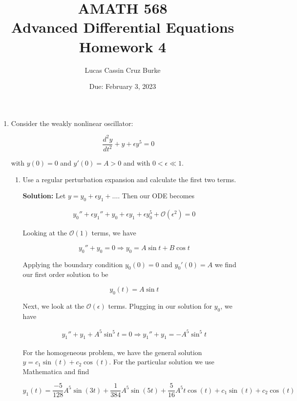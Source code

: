 \documentclass[12pt, a4paper]{article}
\begin{document}
\title{{AMATH 568\\
Advanced Differential Equations}\\
{\bf \Huge Homework 4}}

\author{Lucas Cassin Cruz Burke}

\date{Due: February 3, 2023}

\maketitle

\begin{enumerate}

\item Consider the weakly nonlinear oscillator: 

$$\frac{d^2 y}{dt^2} + y + \epsilon y^5 = 0$$

with $y(0)=0$ and $y'(0)=A>0$ and with $0 < \epsilon \ll 1$.

\begin{enumerate}
    \item Use a regular perturbation expansion and calculate the first two terms.

    \textbf{Solution:} Let $y=y_0 + \epsilon y_1 + \dots$. Then our ODE becomes

    \begin{align*}
        y_0'' + \epsilon y_1'' + y_0 + \epsilon y_1 + \epsilon y_0^5 + \mathcal{O}(\epsilon^2) = 0
    \end{align*}

    Looking at the $\mathcal{O}(1)$ terms, we have

    $$y_0''+y_0=0 \Rightarrow y_0=A\sin t+B\cos t$$

    Applying the boundary condition $y_0(0)=0$ and $y_0'(0)=A$ we find our first order solution to be

    $$y_0(t) = A \sin t$$

    Next, we look at the $\mathcal{O}(\epsilon)$ terms. Plugging in our solution for $y_0$, we have

    \begin{align*}
        y_1'' + y_1 +A^5 \sin^5 t = 0 \Rightarrow y_1'' + y_1 = -A^5 \sin^5 t
    \end{align*}

    For the homogeneous problem, we have the general solution $y = c_1\sin(t) + c_2\cos(t)$. For the particular solution we use Mathematica and find

    $$y_1(t) = \frac{-5}{128} A^5 \sin(3t) + \frac{1}{384} A^5 \sin(5t) + \frac{5}{16} A^5 t\cos(t) + c_1 \sin(t) + c_2 \cos(t)$$


\end{enumerate}
\end{enumerate}
\end{document}
